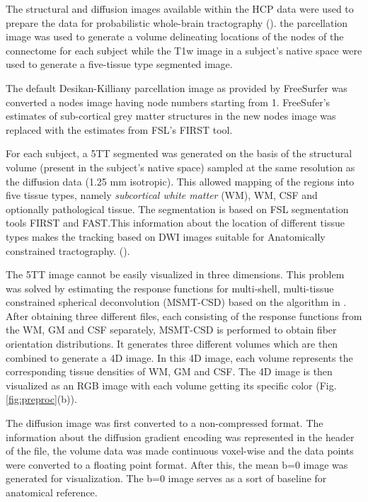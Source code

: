 \documentclass[msthesis.tex]{subfiles}
\begin{document}
The structural and diffusion images available within the HCP data were used to prepare the data for probabilistic whole-brain tractography (\cite{parker2003framework}). the parcellation image was used to generate a volume delineating locations of the nodes of the connectome for each subject while the T1w image in a subject's native space were used to generate a five-tissue type segmented image.

The default Desikan-Killiany parcellation image as provided by FreeSurfer was converted a nodes image having node numbers starting from 1. FreeSufer's estimates of sub-cortical grey matter structures in the new nodes image was replaced with the estimates from FSL's FIRST tool. 

For each subject, a 5TT segmented was generated on the basis of the structural volume (present in the subject's native space) sampled at the same resolution as the diffusion data (1.25 mm isotropic). This allowed mapping of the regions into five tissue types, namely \textit{subcortical white matter} (WM), WM, CSF and optionally pathological tissue. The segmentation is based on FSL segmentation tools FIRST and FAST.This information about the location of different tissue types makes the tracking based on DWI images suitable for Anatomically constrained tractography.  (\cite{anattractsmith}).

The 5TT image cannot be easily visualized in three dimensions. This problem was solved by estimating the response functions for multi-shell, multi-tissue constrained spherical deconvolution (MSMT-CSD)  based on the algorithm in \cite{jeurissen2014multi}. After obtaining three different files, each consisting of the response functions from the WM, GM and CSF separately, MSMT-CSD is performed to obtain fiber orientation distributions. It generates three different volumes which are then combined to generate a 4D image. In this 4D image, each volume represents the corresponding tissue densities of WM, GM and CSF. The 4D image is then visualized as an RGB image with each volume getting its specific color (Fig. \ref{fig:preproc}(b)). 


\iffalse
The diffusion image was first converted to a non-compressed format. The information about the diffusion gradient encoding was represented in the header of the file, the volume data was made continuous voxel-wise and the data points were converted to a floating point format. 
After this, the mean b=0 image was generated for visualization. The b=0 image serves as a sort of baseline for anatomical reference.
\end{document}
